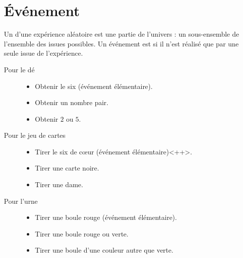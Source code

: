 \section{Événement}

\begin{definition}
    Un  d'une expérience aléatoire est une partie de l'univers : un sous-ensemble de l'ensemble des issues possibles. Un événement est  si il n'est réalisé que par une seule issue de l'expérience.
\end{definition}

\begin{example}
    \begin{description}
        \item[Pour le dé]
            \begin{itemize}
                \item Obtenir le six (événement élémentaire).
                \item
                    Obtenir un nombre pair.
                \item
                    Obtenir \( 2\) ou \( 5\).
            \end{itemize}
        \item[Pour le jeu de cartes]
    \begin{itemize}
        \item
            Tirer le six de cœur (événement élémentaire)<++>.
        \item Tirer une carte noire.
        \item
            Tirer une dame.
    \end{itemize}
\item[Pour l'urne]
    \begin{itemize}
        \item Tirer une boule rouge (événement élémentaire).
        \item
            Tirer une boule rouge ou verte.
        \item
            Tirer une boule d'une couleur autre que verte.
    \end{itemize}
    \end{description}
\end{example}

